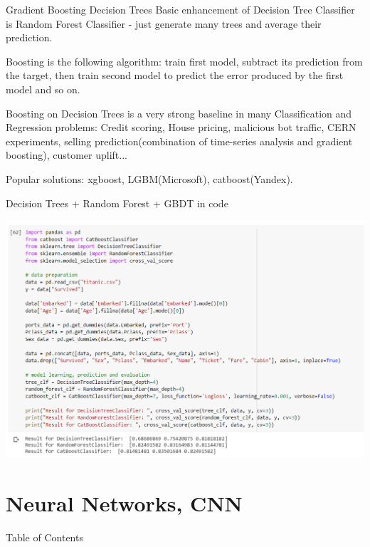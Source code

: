 \documentclass{beamer}
\theoremstyle{remark}
\begin{document}
\begin{frame}{Gradient Boosting Decision Trees}
    Basic enhancement of Decision Tree Classifier is Random Forest Classifier - just generate many trees and average their prediction.\vspace{0.1in}
    
    Boosting is the following algorithm: train first model, subtract its prediction from the target, then train second model to predict the error produced by the first model and so on.\vspace{0.1in}
    
    Boosting on Decision Trees is a very strong baseline in many Classification and Regression problems: Credit scoring, House pricing, malicious bot traffic, CERN experiments, selling prediction(combination of time-series analysis and gradient boosting), customer uplift...\vspace{0.1in}
    
    Popular solutions: xgboost, LGBM(Microsoft), catboost(Yandex).
\end{frame}

\begin{frame}{Decision Trees + Random Forest + GBDT in code}
    \begin{center}
    \includegraphics[width=\textwidth]{pictures/code_trees2.png}
    \end{center}
\end{frame}

\section{Neural Networks, CNN}

\begin{frame}{Table of Contents}
    \tableofcontents[currentsection]
\end{frame}
\end{document}
